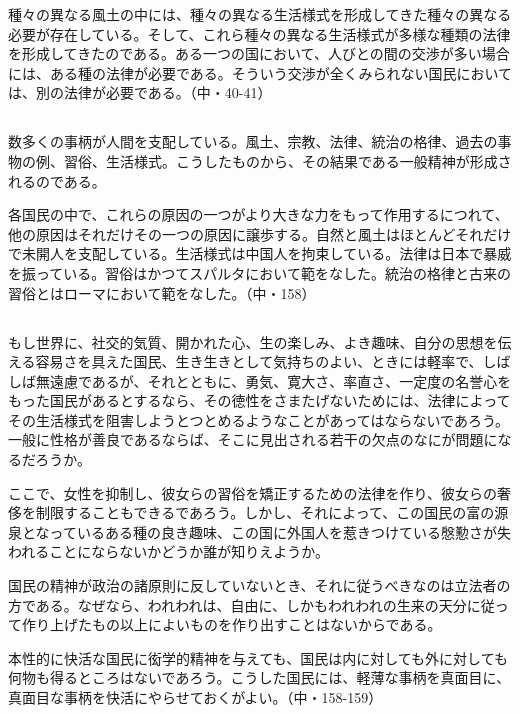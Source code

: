 種々の異なる風土の中には、種々の異なる生活様式を形成してきた種々の異なる必要が存在している。そして、これら種々の異なる生活様式が多様な種類の法律を形成してきたのである。ある一つの国において、人びとの間の交渉が多い場合には、ある種の法律が必要である。そういう交渉が全くみられない国民においては、別の法律が必要である。（中・40-41）

\subsection{}


数多くの事柄が人間を支配している。風土、宗教、法律、統治の格律、過去の事物の例、習俗、生活様式。こうしたものから、その結果である一般精神が形成されるのである。

各国民の中で、これらの原因の一つがより大きな力をもって作用するにつれて、他の原因はそれだけその一つの原因に譲歩する。自然と風土はほとんどそれだけで未開人を支配している。生活様式は中国人を拘束している。法律は日本で暴威を振っている。習俗はかつてスパルタにおいて範をなした。統治の格律と古来の習俗とはローマにおいて範をなした。（中・158）


\subsection{}


もし世界に、社交的気質、開かれた心、生の楽しみ、よき趣味、自分の思想を伝える容易さを具えた国民、生き生きとして気持ちのよい、ときには軽率で、しばしば無遠慮であるが、それとともに、勇気、寛大さ、率直さ、一定度の名誉心をもった国民があるとするなら、その徳性をさまたげないためには、法律によってその生活様式を阻害しようとつとめるようなことがあってはならないであろう。一般に性格が善良であるならば、そこに見出される若干の欠点のなにが問題になるだろうか。

ここで、女性を抑制し、彼女らの習俗を矯正するための法律を作り、彼女らの奢侈を制限することもできるであろう。しかし、それによって、この国民の富の源泉となっているある種の良き趣味、この国に外国人を惹きつけている慇懃さが失われることにならないかどうか誰が知りえようか。

国民の精神が政治の諸原則に反していないとき、それに従うべきなのは立法者の方である。なぜなら、われわれは、自由に、しかもわれわれの生来の天分に従って作り上げたもの以上によいものを作り出すことはないからである。

本性的に快活な国民に衒学的精神を与えても、国民は内に対しても外に対しても何物も得るところはないであろう。こうした国民には、軽薄な事柄を真面目に、真面目な事柄を快活にやらせておくがよい。（中・158-159）

